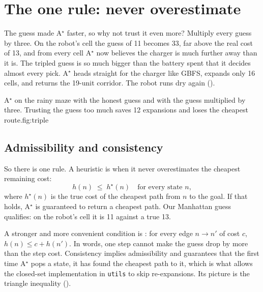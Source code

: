 \section{The one rule: never overestimate}

The guess made A$^\star$ faster, so why not trust it even more? Multiply every guess by three. On the robot's cell the guess of 11 becomes 33, far above the real cost of 13, and from every cell A$^\star$ now believes the charger is much further away than it is. The tripled guess is so much bigger than the battery spent that it decides almost every pick. A$^\star$ heads straight for the charger like GBFS, expands only 16 cells, and returns the 19-unit corridor. The robot runs dry again ().

\begin{utpfig}{A$^\star$ on the rainy maze with the honest guess and with the guess multiplied by three. Trusting the guess too much saves 12 expansions and loses the cheapest route.}{fig:triple}
\end{utpfig}

\subsection{Admissibility and consistency}

So there is one rule. A heuristic is  when it never overestimates the cheapest remaining cost:
\[
h(n)\;\le\;h^\star(n)\quad\text{for every state } n,
\]
where $h^\star(n)$ is the true cost of the cheapest path from $n$ to the goal. If that holds, A$^\star$ is guaranteed to return a cheapest path. Our Manhattan guess qualifies: on the robot's cell it is 11 against a true 13.

A stronger and more convenient condition is : for every edge $n\to n'$ of cost $c$, $h(n)\le c+h(n')$. In words, one step cannot make the guess drop by more than the step cost. Consistency implies admissibility and guarantees that the first time A$^\star$ pops a state, it has found the cheapest path to it, which is what allows the closed-set implementation in \texttt{utils} to skip re-expansions. Its picture is the triangle inequality ().

